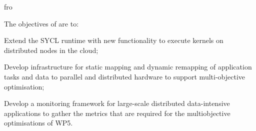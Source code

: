 fro\addtocounter{wpno}{1}
\begin{Workpackage}{\thewpno}
\WPTitle{\wpname{\thewpno}}


\begin{WPObjectives}
The objectives of \theWP{} are to:
  \begin{compactitem}
  \item Extend the SYCL runtime with new functionality to execute kernels on distributed nodes in the cloud;

  \item Develop infrastructure for static mapping and dynamic remapping of application tasks and data to parallel and distributed hardware
  to support multi-objective optimisation;

  \item Develop a monitoring framework for large-scale distributed data-intensive applications to gather the metrics that are required for the multiobjective optimisations of WP5.
  \end{compactitem}
  
\end{WPObjectives}




\end{Workpackage}
